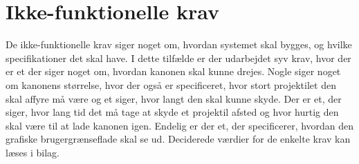 \section{Ikke-funktionelle krav}
De ikke-funktionelle krav siger noget om, hvordan systemet skal bygges, og hvilke specifikationer det skal have. I dette tilfælde er der udarbejdet syv krav, hvor der er et der siger noget om, hvordan kanonen skal kunne drejes. Nogle siger noget om kanonens størrelse, hvor der også er specificeret, hvor stort projektilet den skal affyre må være og et siger, hvor langt den skal kunne skyde. Der er et, der siger, hvor lang tid det må tage at skyde et projektil afsted og hvor hurtig den skal være til at lade kanonen igen. Endelig er der et, der specificerer, hvordan den grafiske brugergrænseflade skal se ud. Deciderede værdier for de enkelte krav kan læses i bilag. 








